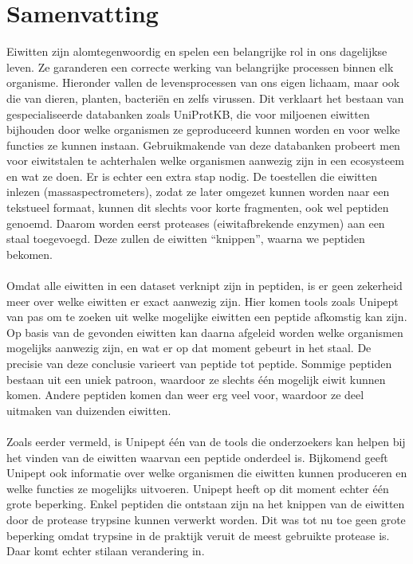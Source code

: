 \chapter*{Samenvatting}
Eiwitten zijn alomtegenwoordig en spelen een belangrijke rol in ons dagelijkse leven.
Ze garanderen een correcte werking van belangrijke processen binnen elk organisme.
Hieronder vallen de levensprocessen van ons eigen lichaam, maar ook die van dieren, planten, bacteriën en zelfs virussen.
Dit verklaart het bestaan van gespecialiseerde databanken zoals UniProtKB, die voor miljoenen eiwitten bijhouden door welke organismen ze geproduceerd kunnen worden en voor welke functies ze kunnen instaan.
Gebruikmakende van deze databanken probeert men voor eiwitstalen te achterhalen welke organismen aanwezig zijn in een ecosysteem en wat ze doen.
Er is echter een extra stap nodig.
De toestellen die eiwitten inlezen (massaspectrometers), zodat ze later omgezet kunnen worden naar een tekstueel formaat, kunnen dit slechts voor korte fragmenten, ook wel peptiden genoemd.
Daarom worden eerst proteases (eiwitafbrekende enzymen) aan een staal toegevoegd.
Deze zullen de eiwitten ``knippen'', waarna we peptiden bekomen.
\\ \\
Omdat alle eiwitten in een dataset verknipt zijn in peptiden, is er geen zekerheid meer over welke eiwitten er exact aanwezig zijn.
Hier komen tools zoals Unipept van pas om te zoeken uit welke mogelijke eiwitten een peptide afkomstig kan zijn.
Op basis van de gevonden eiwitten kan daarna afgeleid worden welke organismen mogelijks aanwezig zijn, en wat er op dat moment gebeurt in het staal.
De precisie van deze conclusie varieert van peptide tot peptide.
Sommige peptiden bestaan uit een uniek patroon, waardoor ze slechts één mogelijk eiwit kunnen komen.
Andere peptiden komen dan weer erg veel voor, waardoor ze deel uitmaken van duizenden eiwitten.
\\ \\
Zoals eerder vermeld, is Unipept één van de tools die onderzoekers kan helpen bij het vinden van de eiwitten waarvan een peptide onderdeel is.
Bijkomend geeft Unipept ook informatie over welke organismen die eiwitten kunnen produceren en welke functies ze mogelijks uitvoeren.
Unipept heeft op dit moment echter één grote beperking.
Enkel peptiden die ontstaan zijn na het knippen van de eiwitten door de protease trypsine kunnen verwerkt worden.
Dit was tot nu toe geen grote beperking omdat trypsine in de praktijk veruit de meest gebruikte protease is.
Daar komt echter stilaan verandering in.
